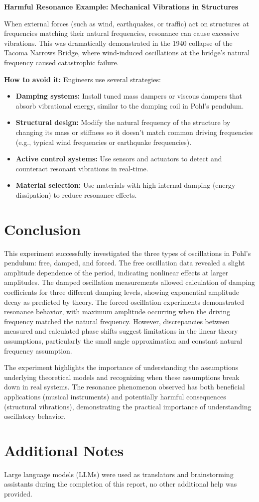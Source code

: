 \documentclass[12pt]{article}
\begin{document}
\textbf{Harmful Resonance Example:} \textbf{Mechanical Vibrations in Structures}

When external forces (such as wind, earthquakes, or traffic) act on structures at frequencies matching their natural frequencies, resonance can cause excessive vibrations. This was dramatically demonstrated in the 1940 collapse of the Tacoma Narrows Bridge, where wind-induced oscillations at the bridge's natural frequency caused catastrophic failure.

\textbf{How to avoid it:} Engineers use several strategies:
\begin{itemize}[leftmargin=*]
\item \textbf{Damping systems:} Install tuned mass dampers or viscous dampers that absorb vibrational energy, similar to the damping coil in Pohl's pendulum.
\item \textbf{Structural design:} Modify the natural frequency of the structure by changing its mass or stiffness so it doesn't match common driving frequencies (e.g., typical wind frequencies or earthquake frequencies).
\item \textbf{Active control systems:} Use sensors and actuators to detect and counteract resonant vibrations in real-time.
\item \textbf{Material selection:} Use materials with high internal damping (energy dissipation) to reduce resonance effects.
\end{itemize}

\section{Conclusion}

This experiment successfully investigated the three types of oscillations in Pohl's pendulum: free, damped, and forced. The free oscillation data revealed a slight amplitude dependence of the period, indicating nonlinear effects at larger amplitudes. The damped oscillation measurements allowed calculation of damping coefficients for three different damping levels, showing exponential amplitude decay as predicted by theory. The forced oscillation experiments demonstrated resonance behavior, with maximum amplitude occurring when the driving frequency matched the natural frequency. However, discrepancies between measured and calculated phase shifts suggest limitations in the linear theory assumptions, particularly the small angle approximation and constant natural frequency assumption.

The experiment highlights the importance of understanding the assumptions underlying theoretical models and recognizing when these assumptions break down in real systems. The resonance phenomenon observed has both beneficial applications (musical instruments) and potentially harmful consequences (structural vibrations), demonstrating the practical importance of understanding oscillatory behavior.

\section*{Additional Notes}

Large language models (LLMs) were used as translators and brainstorming assistants during the completion of this report, no other additional help was provided.
\end{document}
